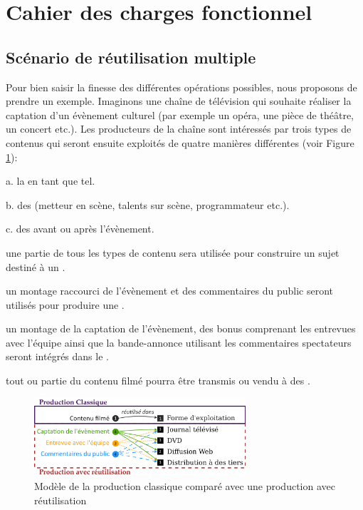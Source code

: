 \section{Cahier des charges fonctionnel}\label{sec:cdc-av}



\subsection{Scénario de réutilisation multiple}\label{sec:ex-reuse}
Pour bien saisir la finesse des différentes opérations possibles, nous proposons de prendre un exemple.
Imaginons une chaîne de télévision qui souhaite réaliser la captation d'un évènement culturel (par exemple un opéra, une pièce de théâtre, un concert etc.). 
Les producteurs de la chaîne sont intéressés par trois types de contenus qui seront ensuite exploités de quatre manières différentes (voir Figure \ref{img:intro:reuse}):
\begin{listenum}
	\item[a.] la  en tant que tel.
	\item[b.] des  (metteur en scène, talents sur scène, programmateur etc.). 
	\item[c.] des  avant ou après l'évènement.\\

	\item une partie de tous les types de contenu sera utilisée pour construire un sujet destiné à un . 
	\item un montage raccourci de l'évènement et des commentaires du public seront utilisés pour produire une .
	\item un montage de la captation de l'évènement, des bonus comprenant les entrevues avec l'équipe ainsi que la bande-annonce utilisant les commentaires spectateurs seront intégrés dans le .	 
	\item tout ou partie du contenu filmé pourra être transmis ou vendu à des . 
\end{listenum}

\begin{figure}[ht!]
\centering
\includegraphics[width=0.7\textwidth]{images/UC-Tahnhauser-v1fr.png}
\caption{Modèle de la production classique comparé avec une production avec réutilisation}
\label{img:intro:reuse}
\end{figure}

